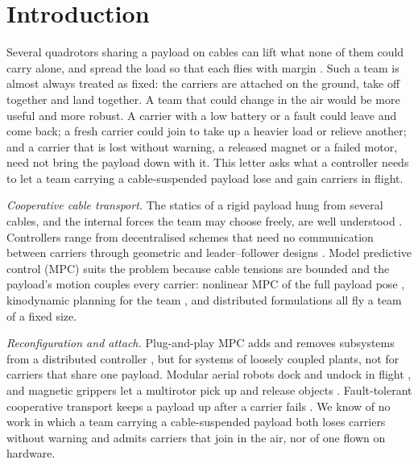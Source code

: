 \section{Introduction}
\label{sec:intro}

Several quadrotors sharing a payload on cables can lift what none of them could carry alone, and spread the load so
that each flies with margin \cite{olleroPresentFutureAerial2022, estevezReviewAerialTransportation2024}. Such a team
is almost always treated as fixed: the carriers are attached on the ground, take off together and land together. A
team that could change in the air would be more useful and more robust. A carrier with a low battery or a fault could
leave and come back; a fresh carrier could join to take up a heavier load or relieve another; and a carrier that is
lost without warning, a released magnet or a failed motor, need not bring the payload down with it. This letter
asks what a controller needs to let a team carrying a cable-suspended payload lose and gain carriers in flight.

\emph{Cooperative cable transport.} The statics of a rigid payload hung from several cables, and the internal forces
the team may choose freely, are well understood \cite{michael2011cooperative, tognon2018internal,
gabellieri2023equilibria}. Controllers range from decentralised schemes that need no communication between carriers
\cite{tognon2018internal, gabellieri2023force, klausen2020cooperative} through geometric and leader--follower designs
\cite{lee2018geometric, loianno2018cooperative}. Model predictive control (MPC) suits the problem because cable tensions are bounded and
the payload's motion couples every carrier: nonlinear MPC of the full payload pose \cite{sunNonlinearMPCFullPose2023,
liNonlinearModelPredictive2023}, kinodynamic planning for the team \cite{wahbaKinodynamicMotionPlanning2024}, and
distributed formulations \cite{decarliDistributedNMPCCooperative, distributedNMPC} all fly a team of a fixed size.

\emph{Reconfiguration and attach.} Plug-and-play MPC adds and removes subsystems from a distributed controller
\cite{riverso2013plug, zeilinger2013plug, aboudonia2022reconfigurable, saccani2023model}, but for systems of
loosely coupled plants, not for carriers that share one payload. Modular aerial robots dock and undock in flight
\cite{saldana2018modquad, sugihara2023trady, sugihara2026legion}, and magnetic grippers let a multirotor pick up and
release objects \cite{gawel2017magnetic, miyazaki2018airborne}. Fault-tolerant cooperative transport keeps a payload
up after a carrier fails \cite{liang2021fault, farrasFaultTolerantControlMultiQuadcopter2024}. We know of no work
in which a team carrying a cable-suspended payload both loses carriers without warning and admits carriers that join
in the air, nor of one flown on hardware.


